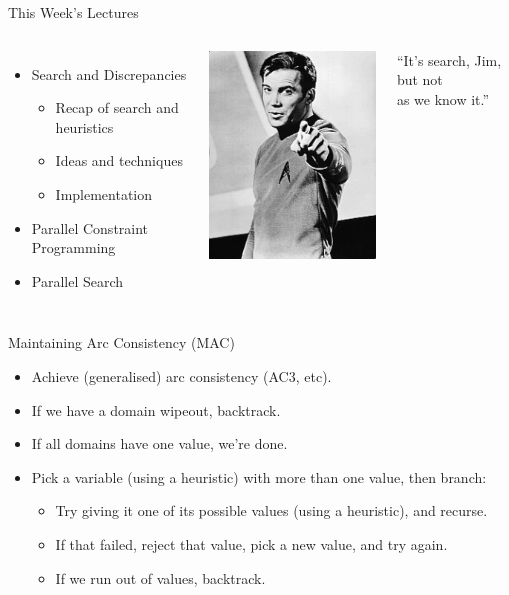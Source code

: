 \documentclass{beamer}
\begin{document}
\begin{frame}{This Week's Lectures}
    \begin{columns}
        \begin{itemize}
            \item \textcolor{uofgcobalt}{Search and Discrepancies}
                \begin{itemize}
                    \item Recap of search and heuristics
                    \item Ideas and techniques
                    \item Implementation
                \end{itemize}
            \item Parallel Constraint Programming
            \item Parallel Search
        \end{itemize}
        \centering\includegraphics*[keepaspectratio=true,scale=0.5]{search-but-not-as-we-know-it.jpg}
        \begin{center}``It's search, Jim, but not\\as we know it.''\end{center}
    \end{columns}
\end{frame}

\begin{frame}{Maintaining Arc Consistency (MAC)}
    \begin{itemize}
        \item Achieve (generalised) arc consistency (AC3, etc).
        \item If we have a domain wipeout, backtrack.
        \item If all domains have one value, we're done.
        \item Pick a variable (using a heuristic) with more than one value, then branch:
            \begin{itemize}
                \item Try giving it one of its possible values (using a heuristic), and recurse.
                \item If that failed, reject that value, pick a new value, and try again.
                \item If we run out of values, backtrack.
            \end{itemize}
    \end{itemize}
\end{frame}
\end{document}
